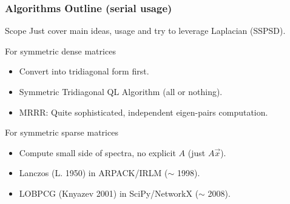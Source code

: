  \begin{frame}
  \frametitle{Algorithms Outline (serial usage)}
  \begin{block}{Scope}
    Just cover main ideas, usage and try to leverage Laplacian (SSPSD).
  \end{block}
  \begin{block}{For symmetric dense matrices}
    \begin{itemize}
      \item Convert into tridiagonal form first.
      \item Symmetric Tridiagonal QL Algorithm (all or nothing).
      \item MRRR: Quite sophisticated, independent eigen-pairs computation.
    \end{itemize}
  \end{block}
  \begin{block}{For symmetric sparse matrices}
    \begin{itemize}
      \item Compute small side of spectra, no explicit $A$ (just $A\vec{x}$).
    \item Lanczos (L. 1950) in ARPACK/IRLM ($\sim$ 1998).
    \item LOBPCG (Knyazev 2001) in SciPy/NetworkX ($\sim$ 2008).
    \end{itemize}
  \end{block}
\end{frame}
